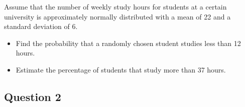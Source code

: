 Assume that the number of weekly study hours for students at a certain university
	is approximately normally distributed with a mean of 22 and a standard deviation
	of 6.
	\begin{itemize}
		\item Find the probability that a randomly chosen student studies less than 12
		hours.
		\item Estimate the percentage of students that study more than 37 hours.
	\end{itemize}



\subsection*{Question 2}